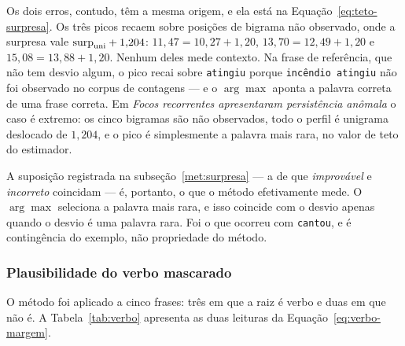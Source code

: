 Os dois erros, contudo, têm a mesma origem, e ela está na Equação~\ref{eq:teto-surpresa}. Os
três picos recaem sobre posições de bigrama não observado, onde a surpresa vale
$\mathrm{surp}_{\mathrm{uni}} + 1{,}204$: $11{,}47 = 10{,}27 + 1{,}20$, $13{,}70 = 12{,}49 + 1{,}20$ e
$15{,}08 = 13{,}88 + 1{,}20$. Nenhum deles mede contexto. Na frase de referência, que não tem
desvio algum, o pico recai sobre \texttt{atingiu} porque \texttt{incêndio atingiu} não foi
observado no corpus de contagens --- e o $\arg\max$ aponta a palavra correta de uma frase
correta. Em \emph{Focos recorrentes apresentaram persistência anômala} o caso é extremo: os
cinco bigramas são não observados, todo o perfil é unigrama deslocado de $1{,}204$, e o pico é
simplesmente a palavra mais rara, no valor de teto do estimador.

A suposição registrada na subseção~\ref{met:surpresa} --- a de que \emph{improvável} e
\emph{incorreto} coincidam --- é, portanto, o que o método efetivamente mede. O $\arg\max$
seleciona a palavra mais rara, e isso coincide com o desvio apenas quando o desvio é uma
palavra rara. Foi o que ocorreu com \texttt{cantou}, e é contingência do exemplo, não
propriedade do método.

\subsubsection{Plausibilidade do verbo mascarado}
\label{res:verbo}

O método foi aplicado a cinco frases: três em que a raiz é verbo e duas em que não é. A
Tabela~\ref{tab:verbo} apresenta as duas leituras da Equação~\ref{eq:verbo-margem}.

\begin{table}[H]
\centering
{}
\caption{A margem do verbo da raiz. As formas esperadas são as mesmas nas três primeiras
frases: \texttt{[destruiu, atingiu, atinge, invadiu, em]}.}
\label{tab:verbo}
\end{table}

